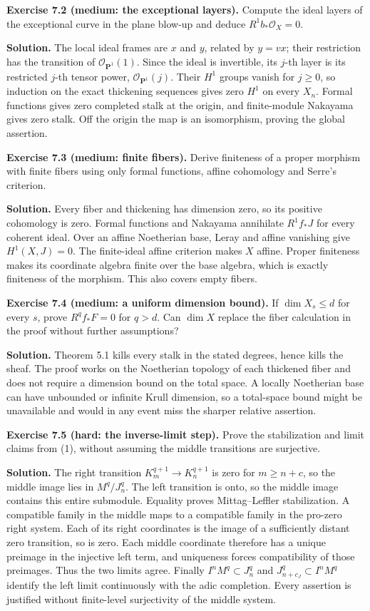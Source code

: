 \documentclass[11pt]{article}
\begin{document}
\textbf{Exercise 7.2 (medium: the exceptional layers).} Compute the
ideal layers of the exceptional curve in the plane blow-up and deduce
\(R^1b_*\mathcal O_X=0\).

\textbf{Solution.} The local ideal frames are \(x\) and \(y\), related
by \(y=vx\); their restriction has the transition of
\(\mathcal O_{\mathbf P^1}(1)\). Since the ideal is invertible, its
\(j\)-th layer is its restricted \(j\)-th tensor power,
\(\mathcal O_{\mathbf P^1}(j)\). Their \(H^1\) groups vanish for
\(j\geq0\), so induction on the exact thickening sequences gives zero
\(H^1\) on every \(X_n\). Formal functions gives zero completed stalk at
the origin, and finite-module Nakayama gives zero stalk. Off the origin
the map is an isomorphism, proving the global assertion.

\textbf{Exercise 7.3 (medium: finite fibers).} Derive finiteness of a
proper morphism with finite fibers using only formal functions, affine
cohomology and Serre's criterion.

\textbf{Solution.} Every fiber and thickening has dimension zero, so its
positive cohomology is zero. Formal functions and Nakayama annihilate
\(R^1f_*J\) for every coherent ideal. Over an affine Noetherian base,
Leray and affine vanishing give \(H^1(X,J)=0\). The finite-ideal affine
criterion makes \(X\) affine. Proper finiteness makes its coordinate
algebra finite over the base algebra, which is exactly finiteness of the
morphism. This also covers empty fibers.

\textbf{Exercise 7.4 (medium: a uniform dimension bound).} If
\(\dim X_s\leq d\) for every \(s\), prove \(R^qf_*F=0\) for \(q>d\). Can
\(\dim X\) replace the fiber calculation in the proof without further
assumptions?

\textbf{Solution.} Theorem 5.1 kills every stalk in the stated degrees,
hence kills the sheaf. The proof works on the Noetherian topology of
each thickened fiber and does not require a dimension bound on the total
space. A locally Noetherian base can have unbounded or infinite Krull
dimension, so a total-space bound might be unavailable and would in any
event miss the sharper relative assertion.

\textbf{Exercise 7.5 (hard: the inverse-limit step).} Prove the
stabilization and limit claims from (1), without assuming the middle
transitions are surjective.

\textbf{Solution.} The right transition \(K_m^{q+1}\to K_n^{q+1}\) is
zero for \(m\geq n+c\), so the middle image lies in \(M^q/J_n^q\). The
left transition is onto, so the middle image contains this entire
submodule. Equality proves Mittag--Leffler stabilization. A compatible
family in the middle maps to a compatible family in the pro-zero right
system. Each of its right coordinates is the image of a sufficiently
distant zero transition, so is zero. Each middle coordinate therefore
has a unique preimage in the injective left term, and uniqueness forces
compatibility of those preimages. Thus the two limits agree. Finally
\(I^nM^q\subset J_n^q\) and \(J_{n+c_J}^q\subset I^nM^q\) identify the
left limit continuously with the adic completion. Every assertion is
justified without finite-level surjectivity of the middle system.
\end{document}
